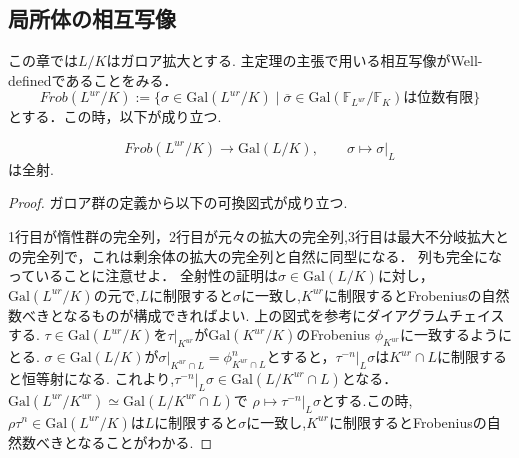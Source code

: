 \documentclass{ujarticle}
\begin{document}
\subsection{局所体の相互写像}
\label{sub:局所体の相互写像}
この章では$L/K$はガロア拡大とする.
主定理の主張で用いる相互写像がWell-definedであることをみる．
\begin{equation*}
Frob({L^{ur}/K}):=\{ \sigma \in \mathrm{Gal}(L^{ur}/K) \mid \overline{\sigma} \in \mathrm{Gal}(\mathbb{F}_{L^{ur}}/\mathbb{F}_K) \mbox{は位数有限}\}
\end{equation*}
とする．この時，以下が成り立つ.
\begin{prop}
  \begin{equation*}
    Frob(L^{ur}/K) \to \mathrm{Gal}(L/K), \qquad \sigma \mapsto \sigma|_{L}
  \end{equation*}
は全射.
\end{prop}
\begin{proof}
ガロア群の定義から以下の可換図式が成り立つ.


1行目が惰性群の完全列，2行目が元々の拡大の完全列,3行目は最大不分岐拡大との完全列で，これは剰余体の拡大の完全列と自然に同型になる．
列も完全になっていることに注意せよ．
全射性の証明は$\sigma \in \mathrm{Gal}(L/K)$に対し，$\mathrm{Gal}(L^{ur}/K)$の元で,$L$に制限すると$\sigma$に一致し,$K^{ur}$に制限するとFrobeniusの自然数べきとなるものが構成できればよい.
上の図式を参考にダイアグラムチェイスする.
$\tau \in \mathrm{Gal}(L^{ur}/K)$を$\tau|_{K^{ur}}$が$\mathrm{Gal}(K^{ur}/K)$のFrobenius $\phi_{K^{ur}}$に一致するようにとる.
$\sigma \in \mathrm{Gal}(L/K)$が$\sigma|_{K^{ur} \cap L}= \phi_{K^{ur} \cap L}^n$とすると，$\tau^{-n}|_L \sigma$は$K^{ur}\cap L$に制限すると恒等射になる.
これより,$\tau^{-n}|_L \sigma \in \mathrm{Gal}(L/K^{ur} \cap L)$となる．
$\mathrm{Gal}(L^{ur}/K^{ur})  \simeq \mathrm{Gal}(L/K^{ur} \cap L)$で
$\rho \mapsto \tau^{-n}|_L \sigma$とする.この時,
$\rho \tau^n \in \mathrm{Gal}(L^{ur}/K)$は$L$に制限すると$\sigma$に一致し,$K^{ur}$に制限するとFrobeniusの自然数べきとなることがわかる.

\end{proof}
\end{document}
